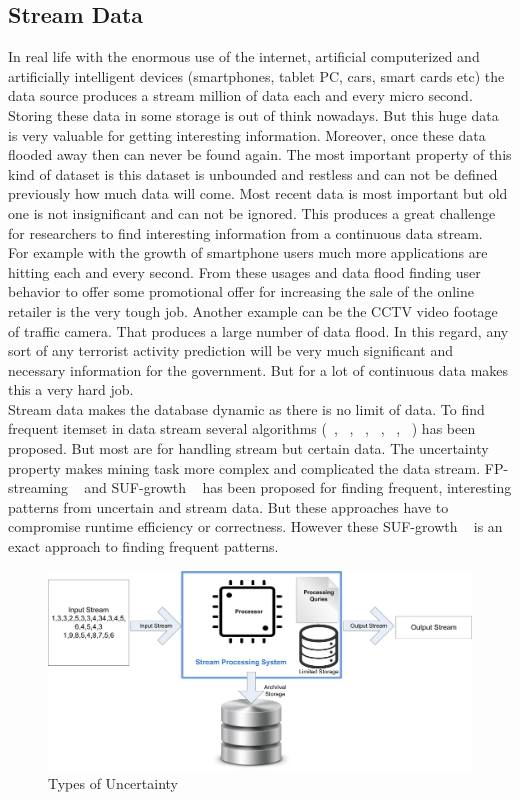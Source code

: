 \subsection{Stream Data}
In real life with the enormous use of the internet, artificial computerized and artificially intelligent devices (smartphones, tablet PC, cars, smart cards etc) the data source produces a stream million of data each and every micro second. Storing these data in some storage is out of think nowadays. But this huge data is very valuable for getting interesting information. Moreover, once these data flooded away then can never be found again. The most important property of this kind of dataset is this dataset is unbounded and restless and can not be defined previously how much data will come. Most recent data is most important but old one is not insignificant and can not be ignored. This produces a great challenge for researchers to find interesting information from a continuous data stream.\\
For example with the growth of smartphone users much more applications are hitting each and every second. From these usages and data flood finding user behavior to offer some promotional offer for increasing the sale of the online retailer is the very tough job. Another example can be the CCTV video footage of traffic camera. That produces a large number of data flood. In this regard, any sort of any terrorist activity prediction will be very much significant and necessary information for the government. But for a lot of continuous data makes this a very hard job.\\
Stream data makes the database dynamic as there is no limit of data. To find frequent itemset in data stream several algorithms (~\cite{uncertain_01}, ~\cite{uncertain_02}, ~\cite{uncertain_03}, ~\cite{uncertain_04}, ~\cite{uncertain_05}, ~\cite{uncertain_06}) has been proposed. But most are for handling stream but certain data. The uncertainty property makes mining task more complex and complicated the data stream. FP-streaming ~\cite{suf_growth} and  SUF-growth ~\cite{suf_growth} has been proposed for finding frequent, interesting patterns from uncertain and stream data. But these approaches have to compromise runtime efficiency or correctness. However these SUF-growth ~\cite{suf_growth} is an exact approach to finding frequent patterns.
\begin{figure}
\centering
  \includegraphics[width=.9\textwidth]{images/stream_data.jpg}
\caption{Types of Uncertainty}
\label{figure:stream_data}
\end{figure}


